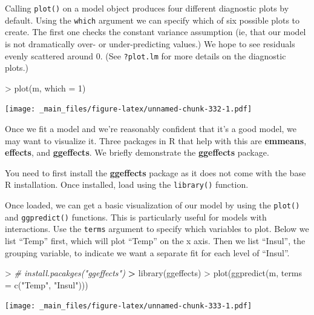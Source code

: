 \documentclass[
]{book}
\newenvironment{Shaded}{\begin{snugshade}}{\end{snugshade}}
\newcommand{\AttributeTok}[1]{\textcolor[rgb]{0.77,0.63,0.00}{#1}}
\newcommand{\CommentTok}[1]{\textcolor[rgb]{0.56,0.35,0.01}{\textit{#1}}}
\newcommand{\DecValTok}[1]{\textcolor[rgb]{0.00,0.00,0.81}{#1}}
\newcommand{\ErrorTok}[1]{\textcolor[rgb]{0.64,0.00,0.00}{\textbf{#1}}}
\newcommand{\FunctionTok}[1]{\textcolor[rgb]{0.00,0.00,0.00}{#1}}
\newcommand{\NormalTok}[1]{#1}
\newcommand{\SpecialCharTok}[1]{\textcolor[rgb]{0.00,0.00,0.00}{#1}}
\newcommand{\StringTok}[1]{\textcolor[rgb]{0.31,0.60,0.02}{#1}}
\begin{document}
Calling \texttt{plot()} on a model object produces four different diagnostic plots by default. Using the \texttt{which} argument we can specify which of six possible plots to create. The first one checks the constant variance assumption (ie, that our model is not dramatically over- or under-predicting values.) We hope to see residuals evenly scattered around 0. (See \texttt{?plot.lm} for more details on the diagnostic plots.)

\begin{Shaded}
\begin{Highlighting}[]
\SpecialCharTok{\textgreater{}} \FunctionTok{plot}\NormalTok{(m, }\AttributeTok{which =} \DecValTok{1}\NormalTok{)}
\end{Highlighting}
\end{Shaded}

\texttt{[image: \_main\_files/figure-latex/unnamed-chunk-332-1.pdf]}

Once we fit a model and we're reasonably confident that it's a good model, we may want to visualize it. Three packages in R that help with this are \textbf{emmeans}, \textbf{effects}, and \textbf{ggeffects}. We briefly demonstrate the \textbf{ggeffects} package.

You need to first install the \textbf{ggeffects} package as it does not come with the base R installation. Once installed, load using the \texttt{library()} function.

Once loaded, we can get a basic visualization of our model by using the \texttt{plot()} and \texttt{ggpredict()} functions. This is particularly useful for models with interactions. Use the \texttt{terms} argument to specify which variables to plot. Below we list ``Temp'' first, which will plot ``Temp'' on the x axis. Then we list ``Insul'', the grouping variable, to indicate we want a separate fit for each level of ``Insul''.

\begin{Shaded}
\begin{Highlighting}[]
\SpecialCharTok{\textgreater{}} \CommentTok{\# install.pacakges("ggeffects")}
\ErrorTok{\textgreater{}} \FunctionTok{library}\NormalTok{(ggeffects)}
\SpecialCharTok{\textgreater{}} \FunctionTok{plot}\NormalTok{(}\FunctionTok{ggpredict}\NormalTok{(m, }\AttributeTok{terms =} \FunctionTok{c}\NormalTok{(}\StringTok{"Temp"}\NormalTok{, }\StringTok{"Insul"}\NormalTok{)))}
\end{Highlighting}
\end{Shaded}

\texttt{[image: \_main\_files/figure-latex/unnamed-chunk-333-1.pdf]}
\end{document}
